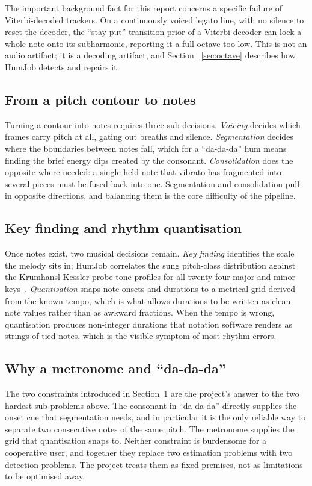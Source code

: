 \documentclass[12pt,a4paper]{article}
\begin{document}
The important background fact for this report concerns a specific failure of
Viterbi-decoded trackers. On a continuously voiced legato line, with no silence
to reset the decoder, the ``stay put'' transition prior of a Viterbi decoder
can lock a whole note onto its subharmonic, reporting it a full octave too low.
This is not an audio artifact; it is a decoding artifact, and Section~%
\ref{sec:octave} describes how HumJob detects and repairs it.

\subsection{From a pitch contour to notes}

Turning a contour into notes requires three sub-decisions. \emph{Voicing}
decides which frames carry pitch at all, gating out breaths and silence.
\emph{Segmentation} decides where the boundaries between notes fall, which for
a ``da-da-da'' hum means finding the brief energy dips created by the
consonant. \emph{Consolidation} does the opposite where needed: a single held
note that vibrato has fragmented into several pieces must be fused back into
one. Segmentation and consolidation pull in opposite directions, and balancing
them is the core difficulty of the pipeline.

\subsection{Key finding and rhythm quantisation}

Once notes exist, two musical decisions remain. \emph{Key finding} identifies
the scale the melody sits in; HumJob correlates the sung pitch-class
distribution against the Krumhansl-Kessler probe-tone profiles for all
twenty-four major and minor keys~\cite{krumhansl}. \emph{Quantisation} snaps
note onsets and durations to a metrical grid derived from the known tempo,
which is what allows durations to be written as clean note values rather than
as awkward fractions. When the tempo is wrong, quantisation produces
non-integer durations that notation software renders as strings of tied notes,
which is the visible symptom of most rhythm errors.

\subsection{Why a metronome and ``da-da-da''}

The two constraints introduced in Section~1 are the project's answer to the two
hardest sub-problems above. The consonant in ``da-da-da'' directly supplies the
onset cue that segmentation needs, and in particular it is the only reliable
way to separate two consecutive notes of the same pitch. The metronome supplies
the grid that quantisation snaps to. Neither constraint is burdensome for a
cooperative user, and together they replace two estimation problems with two
detection problems. The project treats them as fixed premises, not as
limitations to be optimised away.
\end{document}
